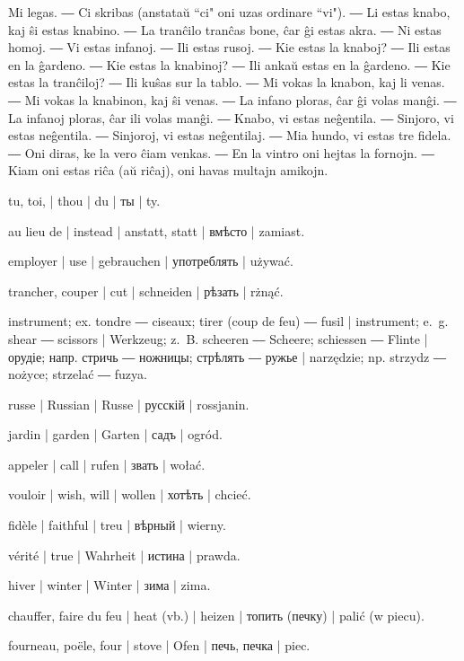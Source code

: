 
Mi legas. ― Ci skribas (anstataŭ ``ci" oni uzas ordinare ``vi"). ― Li estas knabo, kaj ŝi estas knabino. ― La tranĉilo tranĉas bone, ĉar ĝi estas akra. ― Ni estas homoj. ― Vi estas infanoj. ― Ili estas rusoj. ― Kie estas la knaboj? ― Ili estas en la ĝardeno. ― Kie estas la knabinoj? ― Ili ankaŭ estas en la ĝardeno. ― Kie estas la tranĉiloj? ― Ili kuŝas sur la tablo. ― Mi vokas la knabon, kaj li venas. ― Mi vokas la knabinon, kaj ŝi venas. ― La infano ploras, ĉar ĝi volas manĝi. ― La infanoj ploras, ĉar ili volas manĝi. ― Knabo, vi estas neĝentila. ― Sinjoro, vi estas neĝentila. ― Sinjoroj, vi estas neĝentilaj. ― Mia hundo, vi estas tre fidela. ― Oni diras, ke la vero ĉiam venkas. ― En la vintro oni hejtas la fornojn. ― Kiam oni estas riĉa (aŭ riĉaj), oni havas multajn amikojn.

\begin{ekzvocab}{1em}
 tu, toi, | thou | du | ты | ty.

 au lieu de | instead | anstatt, statt | вмѣсто | zamiast.

 employer | use | gebrauchen | употреблять | używać.

 trancher, couper | cut | schneiden | рѣзать | rżnąć.

 instrument; ex.  tondre ―  ciseaux;  tirer (coup de feu) ―  fusil | instrument; e.~g.  shear ―  scissors | Werkzeug; z.~B.  scheeren ―  Scheere;  schiessen ―  Flinte | орудіе; напр.  стричь ―  ножницы;  стрѣлять ―  ружье | narzędzie; np.  strzydz ―  nożyce;  strzelać ―  fuzya.

 russe | Russian | Russe | русскій | rossjanin.

 jardin | garden | Garten | садъ | ogród.

 appeler | call | rufen | звать | wołać.

 vouloir | wish, will | wollen | хотѣть | chcieć.

 fidèle | faithful | treu | вѣрный | wierny.

 vérité | true | Wahrheit | истина | prawda.

 hiver | winter | Winter | зима | zima.

 chauffer, faire du feu | heat (vb.) | heizen | топить (печку) | palić (w piecu).

 fourneau, poële, four | stove | Ofen | печь, печка | piec.

\end{ekzvocab}


